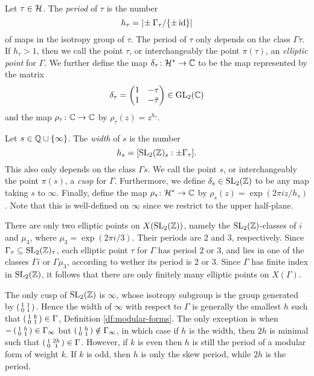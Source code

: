 \begin{defi} \

  Let $\tau\in\mathcal{H}$. The \emph{period} of $\tau$ is the number \[h_\tau=|\!\pm\Gamma_\tau/\{\pm\operatorname{id}\}|\] of maps in the isotropy group of $\tau$. The period of $\tau$ only depends on the class $\Gamma\tau$. If $h_\tau > 1$, then we call the point $\tau$, or interchangeably the point $\pi(\tau)$, an \emph{elliptic point} for $\Gamma$. We further define the map $\delta_\tau\colon\mathcal{H}^*\to\mathbb{C}$ to be the map represented by the matrix
 \[\delta_\tau = \begin{pmatrix}1 & -\tau \\ 1 & -\bar{\tau}\end{pmatrix}\in\operatorname{GL}_2(\mathbb{C})\] and the map $\rho_\tau\colon\mathbb{C}\to\mathbb{C}$ by $\rho_\tau(z)=z^{h_\tau}.$
 
  Let $s\in\mathbb{Q}\cup\{\infty\}$. The \emph{width} of $s$ is the number \[h_s=[\operatorname{SL}_2(\mathbb{Z})_s:\pm\Gamma_\tau].\] This also only depends on the class $\Gamma s$. We call the point $s$, or interchangeably the point $\pi(s)$, a \emph{cusp} for $\Gamma$. Furthermore, we define $\delta_s\in\operatorname{SL}_2(\mathbb{Z})$ to be any map taking $s$ to $\infty$. Finally, define the map $\rho_s\colon\mathcal{H}^*\to\mathbb{C}$ by $\rho_s(z)=\exp(2\pi iz/h_s)$. Note that this is well-defined on $\infty$ since we restrict to the upper half-plane.
\end{defi}

\begin{rmk}
 There are only two elliptic points on $X(\operatorname{SL}_2(\mathbb{Z}))$, namely the $\operatorname{SL}_2(\mathbb{Z})$-classes of $i$ and $\mu_3$, where $\mu_3=\exp(2\pi i/3)$. Their periods are $2$ and $3$, respectively. Since $\Gamma_\tau\subseteq\operatorname{SL}_2(\mathbb{Z})_\tau$, each elliptic point $\tau$ for $\Gamma$ has period $2$ or $3$, and lies in one of the classes $\Gamma i$ or $\Gamma \mu_3$, according to wether its period is $2$ or $3$. Since $\Gamma$ has finite index in $\operatorname{SL}_2(\mathbb{Z})$, it follows that there are only finitely many elliptic points on $X(\Gamma)$.
\end{rmk}
\begin{rmk} \label{pr:width}
 The only cusp of $\operatorname{SL}_2(\mathbb{Z})$ is $\infty$, whose isotropy subgroup is the group generated by $\left(\begin{smallmatrix}1&1\\0&1\end{smallmatrix}\right)$. Hence the width of $\infty$ with respect to $\Gamma$ is generally the smallest $h$ such that $\left(\begin{smallmatrix}1&h\\0&1\end{smallmatrix}\right)\in\Gamma$, \cf Definition \ref{df:modular-forms}. The only exception is when $-\left(\begin{smallmatrix}1&h\\0&1\end{smallmatrix}\right)\in\Gamma_\infty$ but $\left(\begin{smallmatrix}1&h\\0&1\end{smallmatrix}\right)\notin\Gamma_\infty$, in which case if $h$ is the width, then $2h$ is minimal such that $\left(\begin{smallmatrix}1&2h\\0&1\end{smallmatrix}\right)\in\Gamma$. However, if $k$ is even then $h$ is still the period of a modular form of weight $k$. If $k$ is odd, then $h$ is only the skew period, while $2h$ is the period.
\end{rmk}

